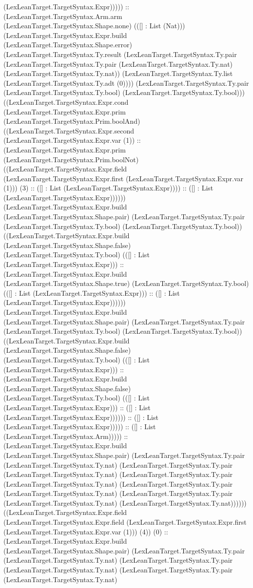\documentclass[11pt]{article}
\begin{document}
(LexLeanTarget.TargetSyntax.Expr))))) :: (LexLeanTarget.TargetSyntax.Arm.arm (LexLeanTarget.TargetSyntax.Shape.none) (([] : List (Nat))) (LexLeanTarget.TargetSyntax.Expr.build (LexLeanTarget.TargetSyntax.Shape.error) (LexLeanTarget.TargetSyntax.Ty.result (LexLeanTarget.TargetSyntax.Ty.pair (LexLeanTarget.TargetSyntax.Ty.pair (LexLeanTarget.TargetSyntax.Ty.nat) (LexLeanTarget.TargetSyntax.Ty.nat)) (LexLeanTarget.TargetSyntax.Ty.list (LexLeanTarget.TargetSyntax.Ty.adt (0)))) (LexLeanTarget.TargetSyntax.Ty.pair (LexLeanTarget.TargetSyntax.Ty.bool) (LexLeanTarget.TargetSyntax.Ty.bool))) ((LexLeanTarget.TargetSyntax.Expr.cond (LexLeanTarget.TargetSyntax.Expr.prim (LexLeanTarget.TargetSyntax.Prim.boolAnd) ((LexLeanTarget.TargetSyntax.Expr.second (LexLeanTarget.TargetSyntax.Expr.var (1)) :: (LexLeanTarget.TargetSyntax.Expr.prim (LexLeanTarget.TargetSyntax.Prim.boolNot) ((LexLeanTarget.TargetSyntax.Expr.field (LexLeanTarget.TargetSyntax.Expr.first (LexLeanTarget.TargetSyntax.Expr.var (1))) (3) :: ([] : List (LexLeanTarget.TargetSyntax.Expr)))) :: ([] : List (LexLeanTarget.TargetSyntax.Expr)))))) (LexLeanTarget.TargetSyntax.Expr.build (LexLeanTarget.TargetSyntax.Shape.pair) (LexLeanTarget.TargetSyntax.Ty.pair (LexLeanTarget.TargetSyntax.Ty.bool) (LexLeanTarget.TargetSyntax.Ty.bool)) ((LexLeanTarget.TargetSyntax.Expr.build (LexLeanTarget.TargetSyntax.Shape.false) (LexLeanTarget.TargetSyntax.Ty.bool) (([] : List (LexLeanTarget.TargetSyntax.Expr))) :: (LexLeanTarget.TargetSyntax.Expr.build (LexLeanTarget.TargetSyntax.Shape.true) (LexLeanTarget.TargetSyntax.Ty.bool) (([] : List (LexLeanTarget.TargetSyntax.Expr))) :: ([] : List (LexLeanTarget.TargetSyntax.Expr)))))) (LexLeanTarget.TargetSyntax.Expr.build (LexLeanTarget.TargetSyntax.Shape.pair) (LexLeanTarget.TargetSyntax.Ty.pair (LexLeanTarget.TargetSyntax.Ty.bool) (LexLeanTarget.TargetSyntax.Ty.bool)) ((LexLeanTarget.TargetSyntax.Expr.build (LexLeanTarget.TargetSyntax.Shape.false) (LexLeanTarget.TargetSyntax.Ty.bool) (([] : List (LexLeanTarget.TargetSyntax.Expr))) :: (LexLeanTarget.TargetSyntax.Expr.build (LexLeanTarget.TargetSyntax.Shape.false) (LexLeanTarget.TargetSyntax.Ty.bool) (([] : List (LexLeanTarget.TargetSyntax.Expr))) :: ([] : List (LexLeanTarget.TargetSyntax.Expr)))))) :: ([] : List (LexLeanTarget.TargetSyntax.Expr))))) :: ([] : List (LexLeanTarget.TargetSyntax.Arm))))) :: (LexLeanTarget.TargetSyntax.Expr.build (LexLeanTarget.TargetSyntax.Shape.pair) (LexLeanTarget.TargetSyntax.Ty.pair (LexLeanTarget.TargetSyntax.Ty.nat) (LexLeanTarget.TargetSyntax.Ty.pair (LexLeanTarget.TargetSyntax.Ty.nat) (LexLeanTarget.TargetSyntax.Ty.pair (LexLeanTarget.TargetSyntax.Ty.nat) (LexLeanTarget.TargetSyntax.Ty.pair (LexLeanTarget.TargetSyntax.Ty.nat) (LexLeanTarget.TargetSyntax.Ty.pair (LexLeanTarget.TargetSyntax.Ty.nat) (LexLeanTarget.TargetSyntax.Ty.nat)))))) ((LexLeanTarget.TargetSyntax.Expr.field (LexLeanTarget.TargetSyntax.Expr.field (LexLeanTarget.TargetSyntax.Expr.first (LexLeanTarget.TargetSyntax.Expr.var (1))) (4)) (0) :: (LexLeanTarget.TargetSyntax.Expr.build (LexLeanTarget.TargetSyntax.Shape.pair) (LexLeanTarget.TargetSyntax.Ty.pair (LexLeanTarget.TargetSyntax.Ty.nat) (LexLeanTarget.TargetSyntax.Ty.pair (LexLeanTarget.TargetSyntax.Ty.nat) (LexLeanTarget.TargetSyntax.Ty.pair (LexLeanTarget.TargetSyntax.Ty.nat) 
\end{document}
